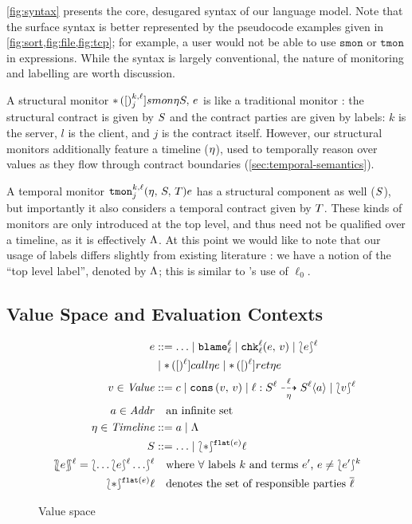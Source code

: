 \documentclass[preprint,onecolumn,9pt]{sigplanconf} %
\begin{document}
%
\autoref{fig:syntax} presents the core, desugared syntax of our language model.
%
Note that the surface syntax is better represented by the pseudocode examples given in \cref{fig:sort,fig:file,fig:tcp}; for example, a user would not be able to use $\mathtt{smon}$ or $\mathtt{tmon}$ in expressions.
%
While the syntax is largely conventional, the nature of monitoring and labelling are worth discussion.

%
A structural monitor ${\tt *}{\,}({[})^{k,\ell}_{j}]{smon}{\eta}{S,\, e}$ is like a traditional monitor \cite{ianjohnson:dthf:complete}: the structural contract is given by $S$ and the contract parties are given by labels: $k$ is the server, $l$ is the client, and $j$ is the contract itself.
%
However, our structural monitors additionally feature a timeline ($\eta$), used to temporally reason over values as they flow through contract boundaries (\autoref{sec:temporal-semantics}).
%

%
A temporal monitor ${\tt tmon}{^{k,\ell}_{j}}({\eta,\,S,\,T}){e}$ has a structural component as well ($S$), but importantly it also considers a temporal contract given by $T$.
%
These kinds of monitors are only introduced at the top level, and thus need not be qualified over a timeline, as it is effectively $\Lambda$.
%
At this point we would like to note that our usage of labels differs slightly from existing literature \cite{ianjohnson:dthf:complete}: we have a notion of the ``top level label'', denoted by $\Lambda$; this is similar to \citeauthor{ianjohnson:dthf:complete}'s use of $\ell_0$.

\subsection{Value Space and Evaluation Contexts}

\begin{figure}
\begin{align*}
\mexp &::= \ldots
 \alt \sblame{\mmlab}{\mmlab}
 \alt \schk{\mmlab}{\mmlab}{\mexp}{\mval}
 \alt \sown{\mexp}{\mmlab} \\
&\alt \scall{\mmlab}{\mtimeline}{\mexp}
 \alt \sret{\mmlab}{\mtimeline}{\mexp}
\\
\mval \in \Value &::=
     \mconstant
\alt \vcons{\mval}{\mval}
\alt \bclos{\mmlab}{\mscon}{\mmlab}{\mmlab}{\mtimeline}{\mscon}{\mmlab}{\maddr}
\alt \sown{\mval}{\mmlab}
\\
\maddr \in \Addr &\quad\text{an infinite set} \\
\mstimeline \in \Timeline &::= \maddr \alt \toplevel
\\
\mscon &::= \ldots
\alt \sown*{\sflat{\mexp}}{\mmlab}
\\
\sOwn{\mexp}{\mmlab} = \sown{ \ldots \sown{\mexp}{\mmlab} \ldots }{\mmlab}
&\quad\text{where $\forall$ labels $k$ and terms $\mexp^\prime$, $\mexp \neq \sown{\mexp^\prime}{k}$}
\\
\sown*{\sflat{\mexp}}{\mmlab} &\quad\text{denotes the set of responsible parties $\overline{\mmlab}$}
\end{align*}
\caption{Value space}
\label{fig:values}
\end{figure}
\end{document}
